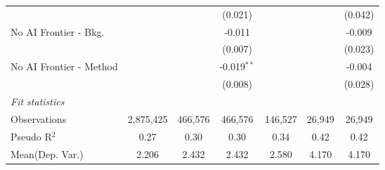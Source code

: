 \begin{tabular}{lcccccc}
                           &           &         & (0.021)       &               &               & (0.042)\\   
   No AI Frontier - Bkg.   &           &         & -0.011        &               &               & -0.009\\   
                           &           &         & (0.007)       &               &               & (0.023)\\   
   No AI Frontier - Method &           &         & -0.019$^{**}$ &               &               & -0.004\\   
                           &           &         & (0.008)       &               &               & (0.028)\\   
   \midrule
   \emph{Fit statistics}\\
   Observations            & 2,875,425 & 466,576 & 466,576       & 146,527       & 26,949        & 26,949\\  
   Pseudo R$^2$            & 0.27      & 0.30    & 0.30          & 0.34          & 0.42          & 0.42\\  
Mean(Dep. Var.) & 2.206 & 2.432 & 2.432 & 2.580 & 4.170 & 4.170 \\
   

\end{tabular}
